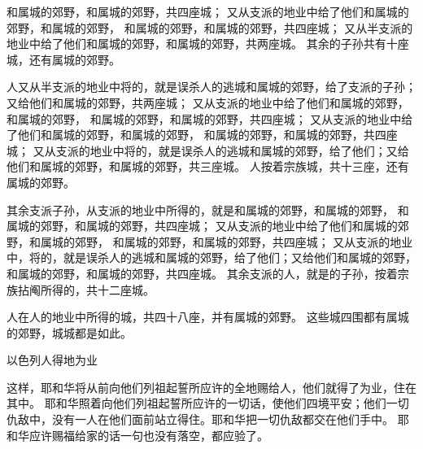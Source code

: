 {和属城的郊野，{}和属城的郊野，共四座城；
又从{}支派的地业中给了他们{}和属城的郊野，{}和属城的郊野，
和属城的郊野，{}和属城的郊野，共四座城；
又从{}半支派的地业中给了他们{}和属城的郊野，{}和属城的郊野，共两座城。
其余的子孙共有十座城，还有属城的郊野。
\par }{\PP {}人又从{}半支派的地业中将{}的{}，就是误杀人的逃城和属城的郊野，给了{}支派{}的子孙；又给他们{}和属城的郊野，共两座城；
又从{}支派的地业中给了他们{}和属城的郊野，{}和属城的郊野，
和属城的郊野，{}和属城的郊野，共四座城；
又从{}支派的地业中给了他们{}和属城的郊野，{}和属城的郊野，
和属城的郊野，{}和属城的郊野，共四座城；
又从{}支派的地业中将{}的{}，就是误杀人的逃城和属城的郊野，给了他们；又给他们{}和属城的郊野，{}和属城的郊野，共三座城。
人按着宗族{}城，共十三座，还有属城的郊野。
\par }{\PP {}其余{}支派{}子孙，从{}支派的地业中所得的，就是{}和属城的郊野，{}和属城的郊野，
和属城的郊野，{}和属城的郊野，共四座城；
又从{}支派的地业中给了他们{}和属城的郊野，{}和属城的郊野，
和属城的郊野，{}和属城的郊野，共四座城；
又从{}支派的地业中，将{}的{}，就是误杀人的逃城和属城的郊野，给了他们；又给他们{}和属城的郊野，
和属城的郊野，{}和属城的郊野，共四座城。
其余{}支派的人，就是{}的子孙，按着宗族拈阄所得的，共十二座城。
\par }{\PP {}人在{}人的地业中所得的城，共四十八座，并有属城的郊野。
这些城四围都有属城的郊野，城城都是如此。
\par }{\SH 以色列人得地为业
\par }{\PP {}这样，耶和华将从前向他们列祖起誓所应许的全地赐给{}人，他们就得了为业，住在其中。
耶和华照着向他们列祖起誓所应许的一切话，使他们四境平安；他们一切仇敌中，没有一人在他们面前站立得住。耶和华把一切仇敌都交在他们手中。
耶和华应许赐福给{}家的话一句也没有落空，都应验了。

}
